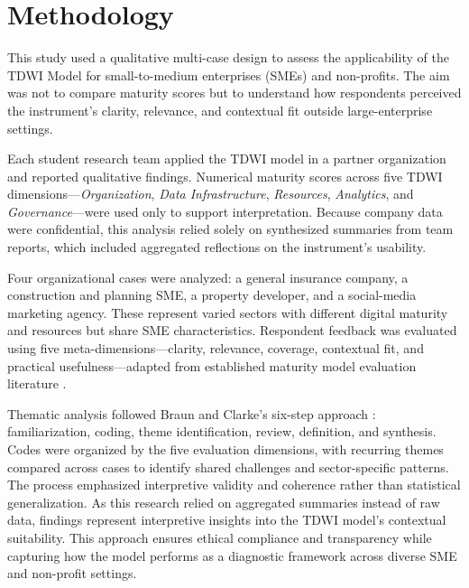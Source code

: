\documentclass[conference]{IEEEtran}
\begin{document}
\section{Methodology}
\label{sec:methodology}

This study used a qualitative multi-case design to assess the applicability of the TDWI Model for small-to-medium enterprises (SMEs) and non-profits. The aim was not to compare maturity scores but to understand how respondents perceived the instrument’s clarity, relevance, and contextual fit outside large-enterprise settings.

Each student research team applied the TDWI model in a partner organization and reported qualitative findings. Numerical maturity scores across five TDWI dimensions---\textit{Organization}, \textit{Data Infrastructure}, \textit{Resources}, \textit{Analytics}, and \textit{Governance}---were used only to support interpretation. Because company data were confidential, this analysis relied solely on synthesized summaries from team reports, which included aggregated reflections on the instrument’s usability.

Four organizational cases were analyzed: a general insurance company, a construction and planning SME, a property developer, and a social-media marketing agency. These represent varied sectors with different digital maturity and resources but share SME characteristics. Respondent feedback was evaluated using five meta-dimensions---clarity, relevance, coverage, contextual fit, and practical usefulness---adapted from established maturity model evaluation literature \cite{becker2009developing, schuster2021maturity, holtzblatt2015contextual, llave2019review}. 

Thematic analysis followed Braun and Clarke’s six-step approach \cite{braun2006using}: familiarization, coding, theme identification, review, definition, and synthesis. Codes were organized by the five evaluation dimensions, with recurring themes compared across cases to identify shared challenges and sector-specific patterns. The process emphasized interpretive validity and coherence rather than statistical generalization.
As this research relied on aggregated summaries instead of raw data, findings represent interpretive insights into the TDWI model’s contextual suitability. 
This approach ensures ethical compliance and transparency while capturing how the model performs as a diagnostic framework across diverse SME and non-profit settings.
\end{document}
